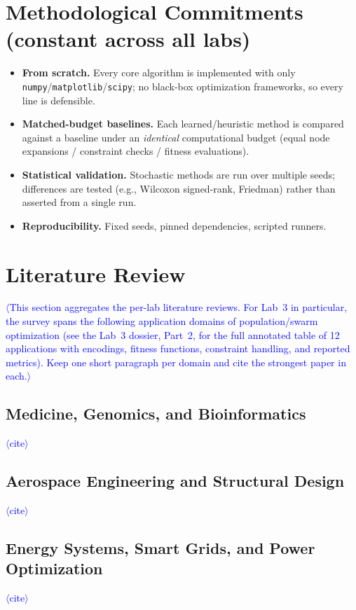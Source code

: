 \documentclass[11pt]{article}
\newcommand{\PH}[1]{\textcolor{blue}{$\langle$#1$\rangle$}}   %
\begin{document}
\section{Methodological Commitments (constant across all labs)}
\label{sec:method}
\begin{itemize}
  \item \textbf{From scratch.} Every core algorithm is implemented with only
        \texttt{numpy}/\texttt{matplotlib}/\texttt{scipy}; no black-box
        optimization frameworks, so every line is defensible.
  \item \textbf{Matched-budget baselines.} Each learned/heuristic method is
        compared against a baseline under an \emph{identical} computational
        budget (equal node expansions / constraint checks / fitness
        evaluations).
  \item \textbf{Statistical validation.} Stochastic methods are run over
        multiple seeds; differences are tested (e.g., Wilcoxon signed-rank,
        Friedman) rather than asserted from a single run.
  \item \textbf{Reproducibility.} Fixed seeds, pinned dependencies, scripted
        runners.
\end{itemize}

\section{Literature Review}
\label{sec:litreview}
\PH{This section aggregates the per-lab literature reviews. For Lab~3 in
particular, the survey spans the following application domains of
population/swarm optimization (see the Lab~3 dossier, Part~2, for the full
annotated table of 12 applications with encodings, fitness functions,
constraint handling, and reported metrics). Keep one short paragraph per
domain and cite the strongest paper in each.}

\subsection{Medicine, Genomics, and Bioinformatics}\PH{cite}
\subsection{Aerospace Engineering and Structural Design}\PH{cite}
\subsection{Energy Systems, Smart Grids, and Power Optimization}\PH{cite}
\end{document}
